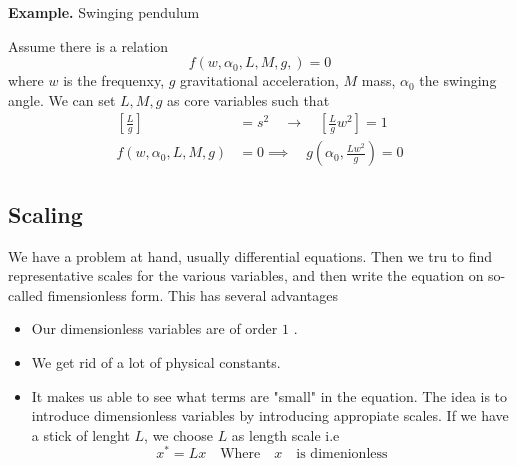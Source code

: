 \documentclass{article}
\theoremstyle{remark}
\begin{document}
\begin{tcolorbox}
  \textbf{Example.} Swinging pendulum 

Assume there is a relation \[
f\left( w, \alpha _{0} , L, M , g,  \right) = 0
\] 
where $w$ is the frequenxy, $g$ gravitational acceleration, $M$ mass, $\alpha _{0}$ the swinging angle.
We can set $L, M, g$ as core variables such that \[
  \begin{split}
    \left[ \frac{L}{g} \right] &= s^2 \quad  \to  \quad  \left[ \frac{L}{g} w^2 \right]  = 1 \\
    f\left( w, \alpha _{0} , L, M, g \right) &=  0 \implies  \quad g\left( \alpha _{0} , \frac{L w^2}{g}  \right)   = 0
  \end{split} 
\] 
\end{tcolorbox}

\subsection{Scaling}%
\label{sub:scaling}
We have a problem at hand, usually differential equations. Then we tru to find representative scales for the various variables, and then write the equation on so-called fimensionless form. This has several advantages 
\begin{itemize}
  \item Our dimensionless variables are of order $1$ .
  \item  We get rid of a lot of physical constants.
  \item It makes us able to see what terms are "small" in the equation.
    The idea is to introduce dimensionless variables by introducing appropiate scales.  If we have a stick of lenght $L$, we choose $L$ as length scale i.e \[
    x^{*} = Lx \quad  \text{Where} \quad   x \quad   \text{is dimenionless} 
    \] 
\end{itemize}
\end{document}
